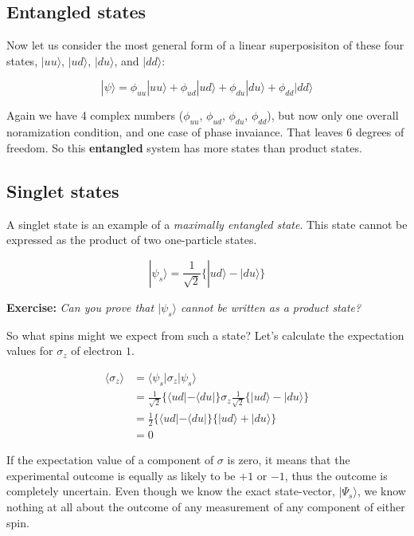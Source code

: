 \documentclass[]{tufte-handout}
\begin{document}
\hypertarget{entangled-states}{%
\subsection{Entangled states}\label{entangled-states}}

Now let us consider the most general form of a linear superposisiton of these four states, \(|uu\rangle\), \(|ud\rangle\), \(|du\rangle\), and \(|dd\rangle\):

\[
| \psi \rangle = \phi_{uu}|uu\rangle+ \phi_{ud}|ud\rangle+ \phi_{du}|du\rangle+ \phi_{dd}|dd\rangle
\]

Again we have 4 complex numbers (\(\phi_{uu}\), \(\phi_{ud}\), \(\phi_{du}\), \(\phi_{dd}\)), but now only one overall noramization condition, and one case of phase invaiance. That leaves 6 degrees of freedom. So this \textbf{entangled} system has more states than product states.

\hypertarget{singlet-states}{%
\subsection{Singlet states}\label{singlet-states}}

A singlet state is an example of a \emph{maximally entangled state}. This state cannot be expressed as the product of two one-particle states.

\[
| \psi_s \rangle = \frac{1}{\sqrt{2}} \Big\{ |ud\rangle - |du\rangle \Big\}
\]

\textbf{Exercise:} \emph{Can you prove that \(| \psi_s \rangle\) cannot be written as a product state?}

\newpage

So what spins might we expect from such a state? Let's calculate the expectation values for \(\sigma_z\) of electron \(1\).

\[
\begin{aligned}
\langle \sigma_z   \rangle  &=  \langle \psi_s | \sigma_z |\psi_s  \rangle \\
&=  \frac{1}{\sqrt{2}}  \Big\{ \langle ud |  - \langle du | \Big\} \sigma_z \frac{1}{\sqrt{2}} \Big\{ |ud  \rangle -|du  \rangle \Big\}  \\
&=\frac{1}{2} \Big\{ \langle ud | - \langle du | \Big\}\Big\{|ud  \rangle +|du  \rangle \Big\} \\
&=0
\end{aligned}
\]

If the expectation value of a component of \(\sigma\) is zero, it means that the experimental outcome is equally as likely to be \(+1\) or \(-1\), thus the outcome is completely uncertain. Even though we know the exact state-vector, \(|\Psi_s\rangle\), we know nothing at all about the outcome of any measurement of any component of either spin.
\end{document}
